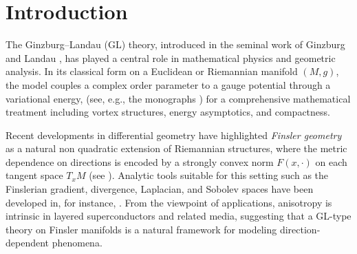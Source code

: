 \documentclass[fleqn,11pt,twoside]{article}
\theoremstyle{definition}
\begin{document}
\begin{abstract}
\noindent 
We present a rigorous generalization of the classical Ginzburg--Landau model to smooth, compact Finsler manifolds without boundary. This framework provides a natural analytic setting for describing anisotropic superconductivity within Finsler geometry. The model is constructed via the Finsler--Laplacian, defined through the Legendre transform associated with the fundamental function $F$, and by employing canonical Finsler measures such as the Busemann--Hausdorff and Holmes--Thompson volume forms. 
We introduce an anisotropic Ginzburg--Landau functional for complex scalar fields coupled to gauge potentials and establish the existence of minimizers in the appropriate Finsler--Sobolev spaces by the direct method in the calculus of variations. 
Furthermore, we analyze the asymptotic regime as the Ginzburg--Landau parameter $\varepsilon \to 0$ and prove a precise $\Gamma$--convergence result: the rescaled energies converge to the Finslerian length functional associated with the limiting vortex filaments. 
In particular, the limiting vortex energy is shown to equal $\pi$ times the Finslerian length of the corresponding current, thereby extending the classical Bethuel--Brezis--H\'elein result to anisotropic settings. 
These findings demonstrate that Finsler geometry unifies metric anisotropy and variational principles in gauge-field models, broadening the geometric scope of the Ginzburg--Landau theory beyond the Riemannian framework.
\end{abstract}


\label{firstpage}


\section{Introduction}\label{sec:Introduction}
The Ginzburg--Landau (GL) theory, introduced in the seminal work of Ginzburg and Landau \cite{GL1950}, has played a central role in mathematical physics and geometric analysis. In its classical form on a Euclidean or Riemannian manifold $(M,g)$, the model couples a complex order parameter to a gauge potential through a variational energy, (see, e.g., the monographs \cite{BBH1994,SandierSerfaty2007}) for a comprehensive
mathematical treatment including vortex structures, energy asymptotics, and compactness.

Recent developments in differential geometry have highlighted \emph{Finsler geometry} as a natural non quadratic extension of Riemannian structures, where the metric dependence on
directions is encoded by a strongly convex norm $F(x,\cdot)$ on each tangent space $T_xM$ (see \cite{BaoChernShen2000,Shen2001}). Analytic tools suitable for this setting such as the Finslerian gradient, divergence, Laplacian, and Sobolev spaces have been developed in, for instance, \cite{OhtaSturm2009,Barthelme2016}.
From the viewpoint of applications, anisotropy is intrinsic in layered superconductors and related media, suggesting that a GL-type theory on Finsler manifolds is a natural
framework for modeling direction-dependent phenomena.
\end{document}
